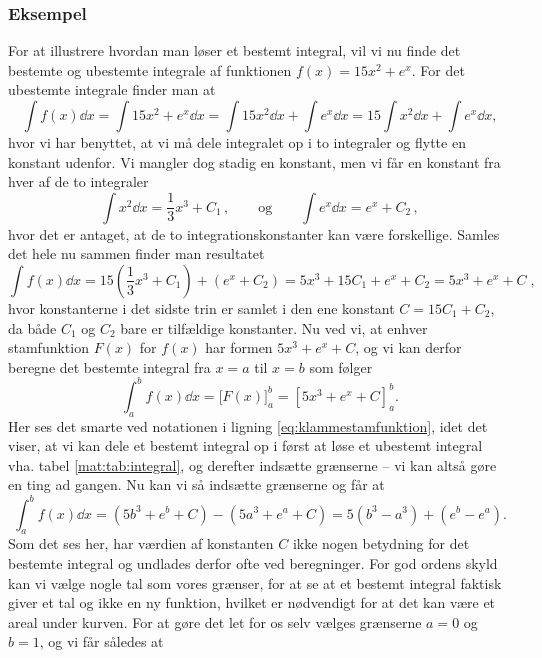 \subsubsection{Eksempel}
For at illustrere hvordan man løser et bestemt integral, vil vi nu finde det bestemte og ubestemte integrale af funktionen $f(x) = 15x^2 + e^x$. For det ubestemte integrale finder man at
\begin{equation*}
\int f(x) \dd{x} = \int 15x^2 + e^x \dd{x} = \int 15x^2 \dd{x} + \int e^x \dd{x} = 15 \int x^2 \dd{x} + \int e^x \dd{x},
\end{equation*}
hvor vi har benyttet, at vi må dele integralet op i to integraler og flytte en konstant udenfor. Vi mangler dog stadig en konstant, men vi får en konstant fra hver af de to integraler
\begin{equation*}
\int x^2 \dd{x} = \frac{1}{3} x^3 + C_1 \, , \qquad \text{og} \qquad \int e^x \dd{x} = e^x + C_2 \, ,
\end{equation*}
hvor det er antaget, at de to integrationskonstanter kan være forskellige. Samles det hele nu sammen finder man resultatet
\begin{equation*}
\int f(x) \dd{x} = 15\left( \frac{1}{3} x^3 + C_1 \right) + \left( e^x + C_2 \right) = 5x^3 + 15C_1 + e^x + C_2 = 5x^3 + e^x + C \; ,
\end{equation*}
hvor konstanterne i det sidste trin er samlet i den ene konstant $C=15C_1+C_2$, da både $C_1$ og $C_2$ bare er tilfældige konstanter. Nu ved vi, at enhver stamfunktion $F(x)$ for $f(x)$ har formen $5x^3 + e^x + C$, og vi kan derfor beregne det bestemte integral fra $x=a$ til $x=b$ som følger
\begin{equation*}
\int_a^b f(x) \dd{x} = \Big[F(x)\Big]_ a^b = \left[ 5x^3 + e^x + C \right]_a^b.
\end{equation*}
Her ses det smarte ved notationen i ligning \eqref{eq:klammestamfunktion}, idet det viser, at vi kan dele et bestemt integral op i først at løse et ubestemt integral vha. tabel \ref{mat:tab:integral}, og derefter indsætte grænserne -- vi kan altså gøre en ting ad gangen. Nu kan vi så indsætte grænserne og får at
\begin{equation*}
    \int_a^b f(x) \dd{x} = \left( 5b^3 + e^b + C \right) - \left( 5a^3 + e^a + C \right) = 5 \left( b^3 - a^3 \right) + \left( e^b - e^a \right).
\end{equation*}
Som det ses her, har værdien af konstanten $C$ ikke nogen betydning for det bestemte integral og undlades derfor ofte ved beregninger. For god ordens skyld kan vi vælge nogle tal som vores grænser, for at se at et bestemt integral faktisk giver et tal og ikke en ny funktion, hvilket er nødvendigt for at det kan være et areal under kurven. For at gøre det let for os selv vælges grænserne $a=0$ og $b=1$, og vi får således at

